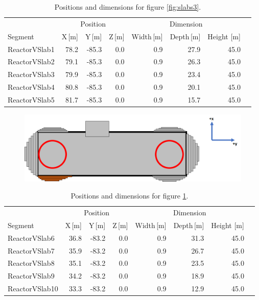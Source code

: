 \begin{table}[!h]
\centering
\begin{tabular}{lrrrrrrr}  
\toprule
\multicolumn{1}{c}{} & \multicolumn{3}{c}{Position} & \multicolumn{3}{c}{Dimension} \\
\cmidrule(r){2-4}
\cmidrule(r){5-7}
Segment       & X\,[m] & Y\,[m] & Z\,[m] & Width\,[m] & Depth\,[m] & Height [m]\\
\midrule
ReactorVSlab1 & 78.2   & -85.3  & 0.0    & 0.9        & 27.9       & 45.0\\
ReactorVSlab2 & 79.1   & -85.3  & 0.0    & 0.9        & 26.3       & 45.0\\
ReactorVSlab3 & 79.9   & -85.3  & 0.0    & 0.9        & 23.4       & 45.0\\
ReactorVSlab4 & 80.8   & -85.3  & 0.0    & 0.9        & 20.1       & 45.0\\
ReactorVSlab5 & 81.7   & -85.3  & 0.0    & 0.9        & 15.7       & 45.0\\
\bottomrule  
\end{tabular}
\caption{Positions and dimensions for figure \ref{fig:slabs3}.}
\label{tab:slabs3}
\end{table}

\begin{figure}[!h]
 \centering
 \includegraphics[width=\linewidth]{Chapter5/Figs/wylfaRasterNew/Slabs4.png}
 \label{fig:slabs4}
\end{figure}

\begin{table}[!h]
\centering
\begin{tabular}{lrrrrrrr}  
\toprule
\multicolumn{1}{c}{} & \multicolumn{3}{c}{Position} & \multicolumn{3}{c}{Dimension} \\
\cmidrule(r){2-4}
\cmidrule(r){5-7}
Segment        & X\,[m] & Y\,[m] & Z\,[m] & Width\,[m] & Depth\,[m] & Height [m]\\
\midrule
ReactorVSlab6  & 36.8   & -83.2  & 0.0    & 0.9        & 31.3       & 45.0\\
ReactorVSlab7  & 35.9   & -83.2  & 0.0    & 0.9        & 26.7       & 45.0\\
ReactorVSlab8  & 35.1   & -83.2  & 0.0    & 0.9        & 23.5       & 45.0\\
ReactorVSlab9  & 34.2   & -83.2  & 0.0    & 0.9        & 18.9       & 45.0\\
ReactorVSlab10 & 33.3   & -83.2  & 0.0    & 0.9        & 12.9       & 45.0\\
\bottomrule  
\end{tabular}
\caption{Positions and dimensions for figure \ref{fig:slabs4}.}
\label{tab:slabs4}
\end{table}

